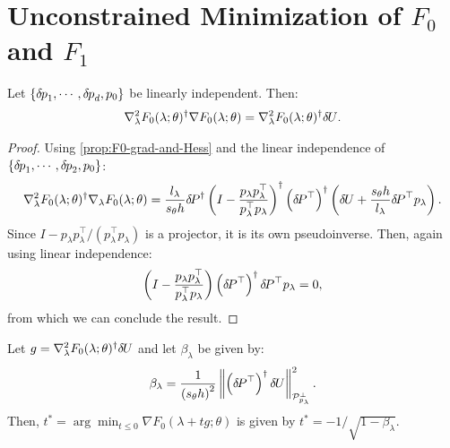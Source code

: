 \documentclass{standalone}
\begin{document}
\section{Unconstrained Minimization of $F_0$ and $F_1$}

\begin{lemma}
  Let $\left\{{\delta \hspace{-0.08em} p}_1, \cdots, {\delta \hspace{-0.08em} p}_d, p_0\right\}$ be linearly
  independent. Then:
  \begin{align*}
    \nabla_\lambda^2 F_0(\lambda; \theta)^\dagger \nabla F_0(\lambda; \theta) = \nabla_\lambda^2 F_0(\lambda; \theta)^\dagger {\delta \hspace{-0.09em} U}.
  \end{align*}
\end{lemma}

\begin{proof}
  Using \cref{prop:F0-grad-and-Hess} and the linear independence
  of $\left\{{\delta \hspace{-0.08em} p}_1, \cdots, {\delta \hspace{-0.08em} p}_2, p_0\right\}$:
  \begin{align*}
    \nabla^2_\lambda F_0(\lambda; \theta)^\dagger \nabla_\lambda F_0(\lambda; \theta) = \frac{l_\lambda}{s_\theta h} {\delta \hspace{-0.14em} P}^\dagger \left(I - \frac{p_\lambda p_\lambda^\top}{p_\lambda^\top p_\lambda}\right)^\dagger \left({\delta \hspace{-0.14em} P}^{\top}\right)^\dagger \left({\delta \hspace{-0.09em} U} + \frac{s_\theta h}{l_\lambda} {\delta \hspace{-0.14em} P}^\top p_\lambda\right).
  \end{align*}
  Since $I - p_\lambda p_\lambda^\top/(p_\lambda^\top p_\lambda)$ is a
  projector, it is its own pseudoinverse. Then, again using linear
  independence:
  \begin{align*}
    \left(I - \frac{p_\lambda p_\lambda^\top}{p_\lambda^\top p_\lambda}\right) \left({\delta \hspace{-0.14em} P}^{\top}\right)^\dagger {\delta \hspace{-0.14em} P}^\top p_\lambda = 0,
  \end{align*}
  from which we can conclude the result.
\end{proof}

\begin{lemma}
  Let $g = \nabla^2_\lambda F_0(\lambda; \theta)^\dagger {\delta \hspace{-0.09em} U}$ and
  let $\beta_\lambda$ be given by:
  \begin{align*}
    \beta_\lambda = \frac{1}{\left(s_\theta h\right)^2} \left\|\left({\delta \hspace{-0.14em} P}^\top\right)^\dagger {\delta \hspace{-0.09em} U}\right\|^2_{\mathcal{P}^\perp_{p_\lambda}}.
  \end{align*}
  Then, $t^* = \arg\min_{t \leq 0} \nabla F_0(\lambda + t g; \theta)$
  is given by $t^* = -1/\sqrt{1 - \beta_\lambda}$.
\end{lemma}
\end{document}
